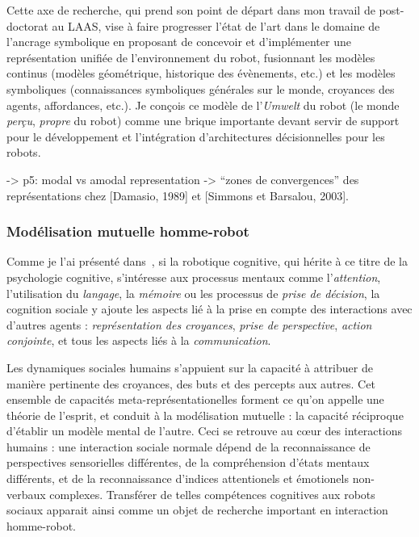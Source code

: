 \documentclass[a4paper]{article}
\begin{document}
Cette axe de recherche, qui prend son point de départ dans mon travail de
post-doctorat au LAAS, vise à faire progresser l'état de l'art dans le domaine
de l'ancrage symbolique en proposant de concevoir et d'implémenter une
représentation unifiée de l'environnement du robot, fusionnant les modèles
continus (modèles géométrique, historique des évènements, etc.) et les modèles
symboliques (connaissances symboliques générales sur le monde, croyances des
agents, affordances, etc.). Je conçois ce modèle de l'\emph{Umwelt} du robot (le
monde \emph{perçu}, \emph{propre} du robot) comme une brique importante devant
servir de support pour le développement et l'intégration d'architectures
décisionnelles pour les robots.


\cite{pezzulo2012computational} -> p5: modal vs amodal representation -> ``zones
de convergences'' des représentations chez [Damasio, 1989] et [Simmons et Barsalou,
2003].

\subsubsection*{Modélisation mutuelle homme-robot}

Comme je l'ai présenté dans~\cite{lemaignan2014human}, si la robotique
cognitive, qui hérite à ce titre de la psychologie cognitive, s'intéresse aux
processus mentaux comme l'\emph{attention}, l'utilisation du \emph{langage}, la
\emph{mémoire} ou les processus de \emph{prise de décision}, la cognition
sociale y ajoute les aspects lié à la prise en compte des interactions avec
d'autres agents : \emph{représentation des croyances}, \emph{prise de
perspective}, \emph{action conjointe}, et tous les aspects liés à la
\emph{communication}.

Les dynamiques sociales humains s'appuient sur la capacité à attribuer de
manière pertinente des croyances, des buts et des percepts aux autres. Cet
ensemble de capacités meta-représentationelles forment ce qu'on appelle une
théorie de l'esprit, et conduit à la modélisation mutuelle : la capacité
réciproque d'établir un modèle mental de l'autre. Ceci se retrouve au c\oe ur
des interactions humains : une interaction sociale normale dépend de la
reconnaissance de perspectives sensorielles différentes, de la compréhension
d'états mentaux différents, et de la reconnaissance d'indices attentionels et
émotionels non-verbaux complexes. Transférer de telles compétences cognitives aux
robots sociaux apparait ainsi comme un objet de recherche important en
interaction homme-robot.
\end{document}
